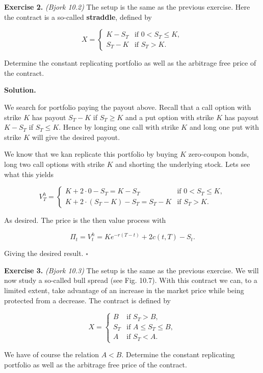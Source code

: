 \documentclass[
]{article}
\begin{document}
\textbf{Exercise 2.} \emph{(Bjork 10.2)} The setup is the same as the
previous exercise. Here the contract is a so-called \textbf{straddle},
defined by

\[
X=
\begin{cases}
  K-S_T & \text{if }0<S_T\le K,\\
  S_T-K & \text{if }S_T>K.
\end{cases}
\]

Determine the constant replicating portfolio as well as the arbitrage
free price of the contract.

\textbf{Solution.}

We search for portfolio paying the payout above. Recall that a call
option with strike \(K\) has payout \(S_T-K\) if \(S_T\ge K\) and a put
option with strike \(K\) has payout \(K-S_T\) if \(S_T\le K\). Hence by
longing one call with strike \(K\) and long one put with strike \(K\)
will give the desired payout.

We know that we kan replicate this portfolio by buying \(K\) zero-coupon
bonds, long two call options with strike \(K\) and shorting the
underlying stock. Lets see what this yields

\[
V_T^h =
\begin{cases}
  K+2\cdot 0-S_T=K-S_T & \text{if }0<S_T\le K,\\
  K+2\cdot(S_T-K)-S_T=S_T-K & \text{if }S_T>K.
\end{cases}
\]

As desired. The price is the then value process with

\[
\Pi_t=V_t^h=Ke^{-r(T-t)}+2c(t,T)-S_t.
\]

Giving the desired result. \(\square\)

\textbf{Exercise 3.} \emph{(Bjork 10.3)} The setup is the same as the
previous exercise. We will now study a so-called bull spread (see Fig.
10.7). With this contract we can, to a limited extent, take advantage of
an increase in the market price while being protected from a decrease.
The contract is defined by

\[
X=
\begin{cases}
  B & \text{if }S_T>B,\\
  S_T & \text{if }A\le S_T\le B,\\
  A &\text{if }S_T< A.
\end{cases}
\]

We have of course the relation \(A<B\). Determine the constant
replicating portfolio as well as the arbitrage free price of the
contract.
\end{document}
